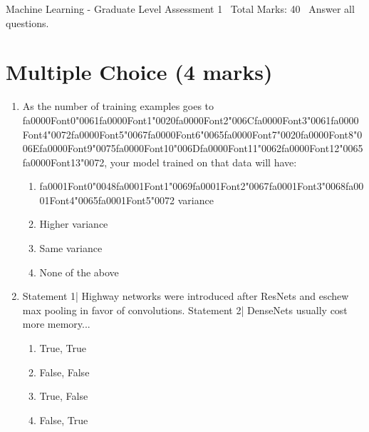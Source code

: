 \documentclass[12pt]{article}
\begin{document}
\begin{center}
Machine Learning - Graduate Level Assessment 1 \
Total Marks: 40 \
Answer all questions.
\end{center}

\section*{Multiple Choice (4 marks)}
\begin{enumerate}[label=\arabic*.]
\item As the number of training examples goes to {\csname fa0000Font0\endcsname\char"0061}{\csname fa0000Font1\endcsname\char"0020}{\csname fa0000Font2\endcsname\char"006C}{\csname fa0000Font3\endcsname\char"0061}{\csname fa0000Font4\endcsname\char"0072}{\csname fa0000Font5\endcsname\char"0067}{\csname fa0000Font6\endcsname\char"0065}{\csname fa0000Font7\endcsname\char"0020}{\csname fa0000Font8\endcsname\char"006E}{\csname fa0000Font9\endcsname\char"0075}{\csname fa0000Font10\endcsname\char"006D}{\csname fa0000Font11\endcsname\char"0062}{\csname fa0000Font12\endcsname\char"0065}{\csname fa0000Font13\endcsname\char"0072}, your model trained on that data will have:
\begin{enumerate}[label=(\alph*)]
    \item {\csname fa0001Font0\endcsname\char"0048}{\csname fa0001Font1\endcsname\char"0069}{\csname fa0001Font2\endcsname\char"0067}{\csname fa0001Font3\endcsname\char"0068}{\csname fa0001Font4\endcsname\char"0065}{\csname fa0001Font5\endcsname\char"0072} variance
    \item Higher variance
    \item Same variance
    \item None of the above
\end{enumerate}
\item Statement 1| Highway networks were introduced after ResNets and eschew max pooling in favor of convolutions. Statement 2| DenseNets usually cost more memory...
\begin{enumerate}[label=(\alph*)]
    \item True, True
    \item False, False
    \item True, False
    \item False, True
\end{enumerate}
\end{enumerate}
\end{document}
